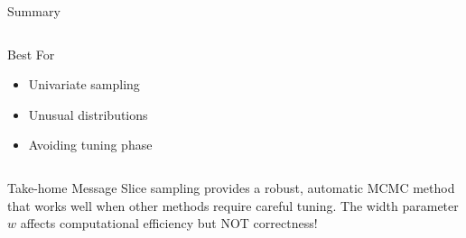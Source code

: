 \documentclass[aspectratio=169]{beamer}
\begin{document}
\begin{frame}{Summary}
\begin{columns}[T]
\begin{column}{0.48\textwidth}
			\begin{block}{Best For}
				\begin{itemize}
					\item Univariate sampling
					\item Unusual distributions
					\item Avoiding tuning phase
				\end{itemize}
			\end{block}
		\end{column}
	\end{columns}

	\vspace{0.5cm}

	\begin{alertblock}{Take-home Message}
		Slice sampling provides a robust, automatic MCMC method that works well when other methods require careful tuning. The width parameter $w$ affects computational efficiency but NOT correctness!
	\end{alertblock}

\end{frame}
\end{document}
